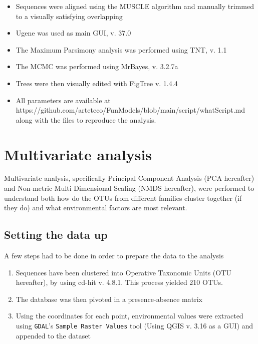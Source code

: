 \begin{itemize}
\item Sequences were aligned using the MUSCLE algorithm and manually trimmed to a visually satisfying overlapping

\item Ugene was used as main GUI, v. 37.0

\item The Maximum Parsimony analysis was performed using TNT, v. 1.1

\item The MCMC was performed using MrBayes, v. 3.2.7a

\item Trees were then visually edited with FigTree v. 1.4.4

\item All parameters are available at https:\slash \slash github.com\slash arteteco\slash FunModels\slash blob\slash main\slash script\slash whatScript.md along with the files to reproduce the analysis.

\end{itemize}

\section{Multivariate analysis}
\label{multivariateanalysis}

Multivariate analysis, specifically Principal Component Analysis (PCA hereafter) and Non-metric Multi Dimensional Scaling (NMDS hereafter), were performed to understand both how do the OTUs from different families cluster together (if they do) and what environmental factors are most relevant.

\subsection{Setting the data up}
\label{settingthedataup}

A few steps had to be done in order to prepare the data to the analysis

\begin{enumerate}
\item  Sequences have been clustered into Operative Taxonomic Units (OTU hereafter), by using cd-hit v. 4.8.1. This process yielded 210 OTUs.

\item  The database was then pivoted in a presence-absence matrix

\item  Using the coordinates for each point, environmental values were extracted using \texttt{GDAL}'s \texttt{Sample Raster Values} tool (Using QGIS v. 3.16 as a GUI) and appended to the dataset

\end{enumerate}

